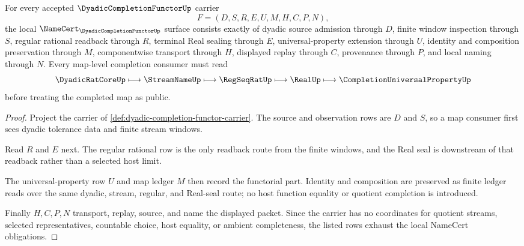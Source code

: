 \begin{theorem}
\label{thm:dyadic-completion-functor-namecert-obligations}
For every accepted $\DyadicCompletionFunctorUp$ carrier
$$
F=(D,S,R,E,U,M,H,C,P,N),
$$
the local $\NameCert_{\DyadicCompletionFunctorUp}$ surface consists exactly of dyadic source admission through $D$, finite window inspection through $S$, regular rational readback through $R$, terminal Real sealing through $E$, universal-property extension through $U$, identity and composition preservation through $M$, componentwise transport through $H$, displayed replay through $C$, provenance through $P$, and local naming through $N$. Every map-level completion consumer must read
$$
\DyadicRatCoreUp \longmapsto \StreamNameUp \longmapsto \RegSeqRatUp \longmapsto \RealUp \longmapsto \CompletionUniversalPropertyUp
$$
before treating the completed map as public.
\end{theorem}
\begin{proof}
Project the carrier of \autoref{def:dyadic-completion-functor-carrier}. The source and observation rows are $D$ and $S$, so a map consumer first sees dyadic tolerance data and finite stream windows.

Read $R$ and $E$ next. The regular rational row is the only readback route from the finite windows, and the Real seal is downstream of that readback rather than a selected host limit.

The universal-property row $U$ and map ledger $M$ then record the functorial part. Identity and composition are preserved as finite ledger reads over the same dyadic, stream, regular, and Real-seal route; no host function equality or quotient completion is introduced.

Finally $H,C,P,N$ transport, replay, source, and name the displayed packet. Since the carrier has no coordinates for quotient streams, selected representatives, countable choice, host equality, or ambient completeness, the listed rows exhaust the local NameCert obligations.
\end{proof}


